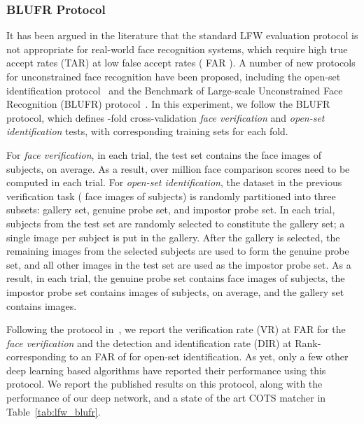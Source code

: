 \documentclass[10pt,journal,compsoc]{IEEEtran}
\begin{document}
\subsubsection{BLUFR Protocol}
It has been argued in the literature that the standard LFW evaluation protocol is not appropriate for real-world face recognition systems, which require high true accept rates (TAR) at low false accept rates ( FAR ). A number of new protocols for unconstrained face recognition have been proposed, including the open-set identification protocol~\cite{faceretrieval:fusion} and the Benchmark of Large-scale Unconstrained Face Recognition (BLUFR) protocol~\cite{BLUFR}. In this experiment, we follow the BLUFR protocol, which defines -fold cross-validation \emph{face verification} and \emph{open-set identification} tests, with corresponding training sets for each fold.

For \emph{face verification}, in each trial, the test set contains the  face images of  subjects, on average. As a result, over  million face comparison scores need to be computed in each trial.  For \emph{open-set identification}, the dataset in the previous verification task ( face images of  subjects) is randomly partitioned into three subsets: gallery set, genuine probe set, and impostor probe set. In each trial,  subjects from the test set are randomly selected to constitute the gallery set; a single image per subject is put in the gallery. After the gallery is selected, the remaining images from the  selected subjects are used to form the genuine probe set, and all other images in the test set are used as the impostor probe set. As a result, in each trial, the genuine probe set contains  face images of  subjects, the impostor probe set contains  images of  subjects, on average, and the gallery set contains  images.

Following the protocol in~\cite{BLUFR}, we report the verification rate (VR) at FAR  for the \emph{face verification} and the detection and identification rate (DIR) at Rank- corresponding to an FAR of  for {open-set identification}. As yet, only a few other deep learning based algorithms have reported their performance using this protocol. We report the published results on this protocol, along with the performance of our deep network, and a state of the art COTS matcher in Table~\ref{tab:lfw_blufr}.
\end{document}
